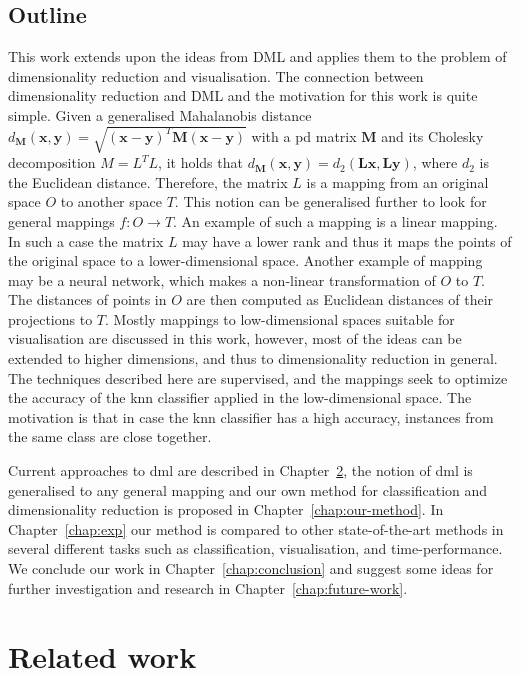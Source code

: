 \documentclass[12pt,a4paper]{report}
\begin{document}
\section{Outline}
This work extends upon the ideas from DML and applies them to the problem of dimensionality reduction and visualisation. The connection between dimensionality reduction and DML and the motivation for this work is quite simple. Given a generalised Mahalanobis distance $d_{\bm{M}}(\textbf{x},\textbf{y}) = \sqrt{(\textbf{x}-\textbf{y})^{T}\bm{M}(\textbf{x}-\textbf{y})}$ with a \ac{pd} matrix $\bm{M}$ and its Cholesky decomposition $M=L^TL$, it holds that $d_{\bm{M}}(\textbf{x},\textbf{y}) = d_{2}(\bm{L}\textbf{x},\bm{L}\textbf{y})$, where $d_2$ is the Euclidean distance. Therefore, the matrix $L$ is a mapping from an original space $O$ to another space $T$. This notion can be generalised further to look for general mappings $f: O \to T$. An example of such a mapping is a linear mapping. In such a case the matrix $L$ may have a lower rank and thus it maps the points of the original space to a lower-dimensional space. Another example of mapping may be a neural network, which makes a non-linear transformation of $O$ to $T$. The distances of points in $O$ are then computed as Euclidean distances of their projections to $T$. Mostly mappings to low-dimensional spaces suitable for visualisation are discussed in this work, however, most of the ideas can be extended to higher dimensions, and thus to dimensionality reduction in general. The techniques described here are supervised, and the mappings seek to optimize the accuracy of the \ac{knn} classifier applied in the low-dimensional space. The motivation is that in case the \ac{knn} classifier has a high accuracy, instances from the same class are close together.

Current approaches to \ac{dml} are described in Chapter~\ref{chap:rw}, the notion of \ac{dml} is generalised to any general mapping and our own method for classification and dimensionality reduction is proposed in Chapter~\ref{chap:our-method}. In Chapter~\ref{chap:exp} our method is compared to other state-of-the-art methods in several different tasks such as classification, visualisation, and time-performance. We conclude our work in Chapter~\ref{chap:conclusion} and suggest some ideas for further investigation and research in Chapter~\ref{chap:future-work}.


\chapter{Related work} \label{chap:rw}
\end{document}

